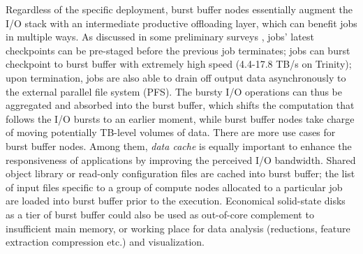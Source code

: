 

Regardless of the specific deployment, burst buffer nodes essentially augment
the I/O stack with an intermediate productive offloading layer, 
which can benefit jobs in multiple ways.
As discussed in some preliminary surveys\cite{apex-workflow} ,
jobs' latest checkpoints can be pre-staged
before the previous job terminates;
jobs can burst checkpoint to burst buffer
with extremely high speed (4.4-17.8 TB/s on Trinity);
upon termination, jobs are also able to drain off output data
asynchronously to the external parallel file system (PFS).
The bursty I/O operations can thus be aggregated and absorbed into the burst buffer,
which shifts the computation that follows the I/O bursts to an earlier moment,
while burst buffer nodes take charge of moving potentially TB-level volumes of data.
There are more use cases for burst buffer nodes.
Among them, \textit{data cache} is equally important to enhance the responsiveness
of applications by improving the perceived I/O bandwidth\cite{TrinitySystem}.
Shared object library or read-only configuration files are cached into burst buffer;
the list of input files specific to a group of compute nodes allocated to
a particular job are loaded into burst buffer prior to the execution.
Economical solid-state disks as a tier of burst buffer could also be used as
out-of-core complement to insufficient main memory\cite{Romanus:CORR:15},
or working place for data analysis (reductions, feature extraction compression etc.)
and visualization\cite{TrinitySystem}.


